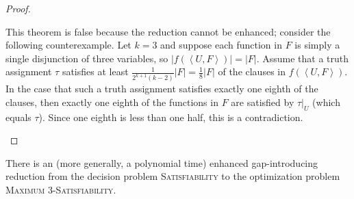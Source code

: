 \documentclass[]{article}
\newcommand{\pair}[2]{{\left\langle{#1}, {#2}\right\rangle}}
\begin{document}
\begin{proof}
  \begin{todo}
    This theorem is false because the reduction cannot be enhanced; consider the following counterexample.
    Let $k = 3$ and suppose each function in $F$ is simply a single disjunction of three variables, so $|f(\pair{U}{F})| = |F|$.
    Assume that a truth assignment $\tau$ satisfies at least $\frac{1}{2^{k + 1} (k - 2)} |F| = \frac{1}{8} |F|$ of the clauses in $f(\pair{U}{F})$.
    In the case that such a truth assignment satisfies exactly one eighth of the clauses, then exactly one eighth of the functions in $F$ are satisfied by $\tau|_U$ (which equals $\tau$).
    Since one eighth is less than one half, this is a contradiction.
  \end{todo}
\end{proof}

\begin{lemma}\label{lem:gap3}
  There is an \NC{} (more generally, a polynomial time) enhanced gap-introducing reduction from the decision problem \textsc{Satisfiability} to the optimization problem \textsc{Maximum 3-Satisfiability}.
\end{lemma}
\end{document}
